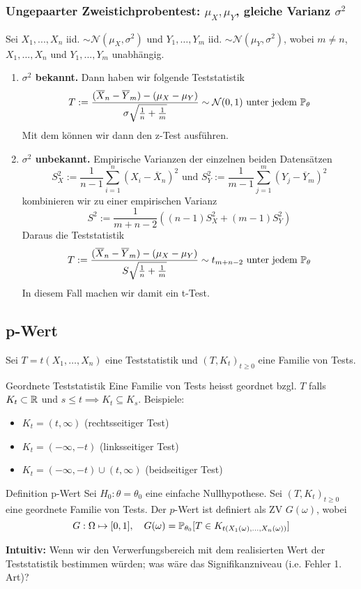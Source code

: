 \subsubsection*{Ungepaarter Zweistichprobentest: $\mu_X, \mu_Y$, gleiche Varianz $\sigma^2$}
Sei $X_1, ..., X_n$ iid. $\sim \mathcal{N}(\mu_X, \sigma^2)$ und $Y_1, \dots, Y_m$ iid. $\sim \mathcal{N}(\mu_Y, \sigma^2)$, wobei $m \neq n$, $X_1, ..., X_n$ und  $Y_1, ..., Y_m$ unabhängig.
\begin{enumerate}
	\item \textbf{$\sigma^2$ bekannt.} Dann haben wir folgende Teststatistik
	\[T := \frac{(\overline{X}_n -\overline{Y}_m) - (\mu_X - \mu_Y)}{\sigma\sqrt{\frac{1}{n}+\frac{1}{m}}} \sim \mathcal{N}(0,1) \text{ unter jedem }\P_{\theta}\]
	Mit dem können wir dann den z-Test ausführen.
	\item \textbf{$\sigma^2$ unbekannt.} Empirische Varianzen der einzelnen beiden Datensätzen
	\[S^2_X := \frac{1}{n-1}\sum_{i=1}^n(X_i - \overline{X}_n)^2 \text{ und } S^2_Y := \frac{1}{m-1}\sum_{j=1}^m(Y_j - \overline{Y}_m)^2\]
	kombinieren wir zu einer empirischen Varianz
	\[S^2 := \frac{1}{m+n-2}((n-1)S^2_X + (m-1)S_Y^2)\]
	Daraus die Teststatistik
	\[T := \frac{(\overline{X}_n -\overline{Y}_m) - (\mu_X - \mu_Y)}{S\sqrt{\frac{1}{n}+\frac{1}{m}}} \sim t_{m+n-2} \text{ unter jedem }\P_{\theta}\]
	In diesem Fall machen wir damit ein t-Test.
\end{enumerate}
\subsection{p-Wert}
Sei \(T = t(X_1, \ldots, X_n)\) eine Teststatistik und \((T,K_t)_{t\ge 0}\) eine Familie von Tests.

\begin{subbox}{Geordnete Teststatistik}
	Eine Familie von Tests heisst geordnet bzgl. \(T\) falls \(K_t \subset \R\) und \(s \le t \implies K_t \subseteq K_s\). Beispiele:
	\begin{itemize}
		\item \(K_t = (t, \infty)\) (rechtsseitiger Test)
		\item \(K_t = (-\infty, -t)\) (linksseitiger Test)
		\item \(K_t = (-\infty, -t) \cup (t, \infty)\) (beidseitiger Test)
	\end{itemize}
\end{subbox}

\begin{mainbox}{Definition p-Wert}
	Sei \(H_0: \theta = \theta_0\) eine einfache Nullhypothese. Sei \((T, K_t)_{t\ge 0}\) eine geordnete Familie von Tests. Der \(p\)-Wert ist definiert als ZV \(G(\omega)\), wobei
	\[G: \Omega \mapsto [0,1], \quad G(\omega) = \P_{\theta_0}[T \in K_{t(X_1(\omega), ..., X_n(\omega))}]\]
\end{mainbox}
\textbf{Intuitiv: } Wenn wir den Verwerfungsbereich mit dem realisierten Wert der Teststatistik bestimmen würden; was wäre das Signifikanzniveau (i.e. Fehler 1. Art)?

